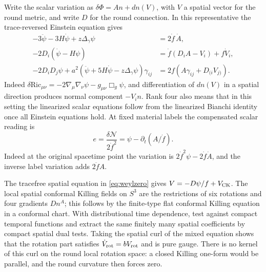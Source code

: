 \documentclass[11pt]{article}
\begin{document}
Write the scalar variation as \(\delta\Phi=A n+dn(V)\), with \(V\) a spatial vector for the round metric, and write \(D\) for the round connection. In this representative the trace-reversed Einstein equation gives
\begin{align}
 -3\ddot\psi-3H\dot\psi+z\Delta_\gamma\psi
    &=2\dot f\,\dot A,\nonumber\\
 -2D_i(\dot\psi-H\psi)
    &=\dot f(D_iA-V_i)+f\dot V_i,\nonumber\\
 -2D_iD_j\psi+
  a^2(\ddot\psi+5H\dot\psi-z\Delta_\gamma\psi)\gamma_{ij}
    &=2f(A\gamma_{ij}+D_{(i}V_{j)}).
 \label{eq:weylzero}
\end{align}
Indeed \(\delta\mathrm{Ric}_{\mu\nu}=-2\nabla_\mu\nabla_\nu\psi-g_{\mu\nu}\Box_g\psi\), and differentiation of \(dn(V)\) in a spatial direction produces normal component \(-V_i n\). Rank four also means that in this setting the linearized scalar equations follow from the linearized Bianchi identity once all Einstein equations hold. At fixed material labels the compensated scalar reading is
\begin{equation}
 e=\frac{\delta\mathcal N}{2\dot f^2}
   =\psi-\partial_t(A/\dot f).
 \label{eq:e}
\end{equation}
Indeed at the original spacetime point the variation is \(2\dot f^2\psi-2\dot f\dot A\), and the inverse label variation adds \(2\ddot f A\).

The tracefree spatial equation in \eqref{eq:weylzero} gives \(V=-D\psi/f+V_{\rm CK}\). The local spatial conformal Killing fields on \(S^3\) are the restrictions of six rotations and four gradients \(Dn^A\); this follows by the finite-type flat conformal Killing equation in a conformal chart. With distributional time dependence, test against compact temporal functions and extract the same finitely many spatial coefficients by compact spatial dual tests. Taking the spatial curl of the mixed equation shows that the rotation part satisfies \(\dot V_{\rm rot}=bV_{\rm rot}\) and is pure gauge. There is no kernel of this curl on the round local rotation space: a closed Killing one-form would be parallel, and the round curvature then forces zero.
\end{document}
